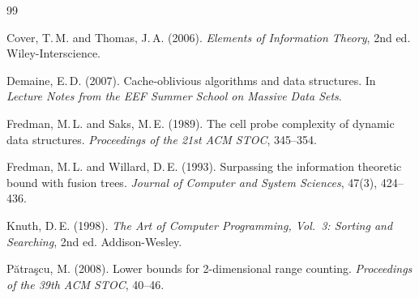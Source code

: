\documentclass[12pt,a4paper]{article}
\theoremstyle{plain}
\theoremstyle{definition}
\theoremstyle{remark}
\begin{document}
\begin{thebibliography}{99}

Cover, T.\,M. and Thomas, J.\,A. (2006).
\emph{Elements of Information Theory}, 2nd ed.
Wiley-Interscience.

Demaine, E.\,D. (2007).
Cache-oblivious algorithms and data structures.
In \emph{Lecture Notes from the EEF Summer School on Massive Data Sets}.

Fredman, M.\,L. and Saks, M.\,E. (1989).
The cell probe complexity of dynamic data structures.
\emph{Proceedings of the 21st ACM STOC}, 345--354.

Fredman, M.\,L. and Willard, D.\,E. (1993).
Surpassing the information theoretic bound with fusion trees.
\emph{Journal of Computer and System Sciences}, 47(3), 424--436.

Knuth, D.\,E. (1998).
\emph{The Art of Computer Programming, Vol.~3: Sorting and Searching},
2nd ed. Addison-Wesley.

P\u{a}tra\c{s}cu, M. (2008).
Lower bounds for 2-dimensional range counting.
\emph{Proceedings of the 39th ACM STOC}, 40--46.

\end{thebibliography}
\end{document}
